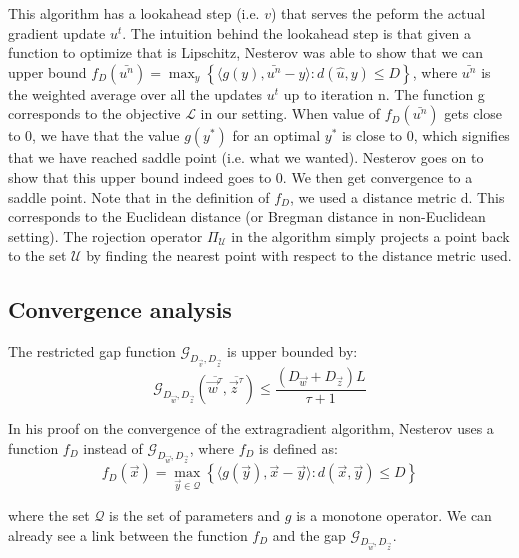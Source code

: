 This algorithm has a lookahead step (i.e. $v$) that serves the peform the actual
gradient update $u^t$. The intuition behind the lookahead step is that given a
function to optimize that is Lipschitz, Nesterov was able to show that we can
upper bound $f_{D}(\bar{u^n}) = \max_y \left \{ \langle g(y),\bar{u^n} - y
\rangle : d(\hat{u},y) \leq D \right \}$, where $\bar{u^n}$ is the weighted
average over all the updates $u^t$ up to iteration n. The function g corresponds
to the objective $\mathcal{L}$ in our setting. When value of $f_D(\bar{u^n})$
gets close to 0, we have that the value $g(y^*)$ for an optimal $y^*$ is close
to 0, which signifies that we have reached saddle point (i.e. what we wanted).
Nesterov goes on to show that this upper bound indeed goes to 0. We then get
convergence to a saddle point. Note that in the definition of $f_D$, we used a
distance metric d. This corresponds to the Euclidean distance (or Bregman
distance in non-Euclidean setting). The rojection operator $\Pi_{\mathcal{U}}$
in the algorithm simply projects a point back to the set $\mathcal{U}$ by
finding the nearest point with respect to the distance metric used.

\subsection{Convergence analysis} The restricted gap function
$\mathcal{G}_{D_{\vec v}, D_{\vec z}}$ is upper bounded by:
\begin{equation} \mathcal{G}_{D_{\vec w}, D_{\vec z}}(\overline{\vec w^{\tau}},
\overline{\vec z^{\tau}}) \leq \frac{\left( D_{\vec w} + D_{\vec z} \right)
L}{\tau + 1}
\end{equation}

In his proof on the convergence of the extragradient algorithm, Nesterov uses a
function $f_D$ instead of $\mathcal{G}_{D_{\vec w}, D_{\vec z}}$, where $f_D$ is
defined as:
\begin{equation}
f_D(\vec x) = \max_{\vec y \in \mathcal{Q}} \left \{ \langle g(\vec y), \vec x -
\vec y \rangle : d(\vec x, \vec y) \leq D \right \}
\end{equation}

where the set $\mathcal{Q}$ is the set of parameters and $g$ is a monotone
operator. We can already see a link between the function $f_D$ and the gap
$\mathcal{G}_{D_{\vec w}, D_{\vec z}}$.


